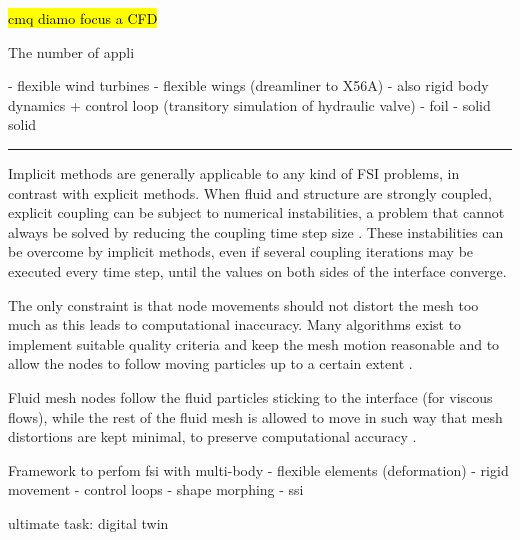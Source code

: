\hl{cmq diamo focus a CFD}

The number of appli


- flexible wind turbines
- flexible wings (dreamliner to X56A)
- also rigid body dynamics + control loop (transitory simulation of hydraulic valve)
- foil
- solid solid 



\noindent\rule{\textwidth}{1pt}









Implicit methods are generally applicable to any kind of FSI problems, in contrast with explicit methods. When fluid and structure are strongly coupled, explicit coupling can be subject to numerical instabilities, a problem that cannot always be solved by reducing the coupling time step size \cite{van2009added}. These instabilities can be overcome by implicit methods, even if several coupling iterations may be executed every time step, until the values on both sides of the interface converge.

The only constraint is that node movements should not distort the mesh too much as this leads to computational inaccuracy. Many algorithms exist to implement suitable quality criteria and keep the mesh motion reasonable and to allow the nodes to follow moving particles up to a certain extent \cite{de2007mesh}.

Fluid mesh nodes follow the fluid particles sticking to the interface (for viscous flows), while the rest of the fluid mesh is allowed to move in such way that mesh distortions are kept minimal, to preserve computational accuracy \cite{ramm1998fluid}.






Framework to perfom fsi with multi-body
- flexible elements (deformation)
- rigid movement
- control loops
- shape morphing
- ssi


ultimate task: digital twin
